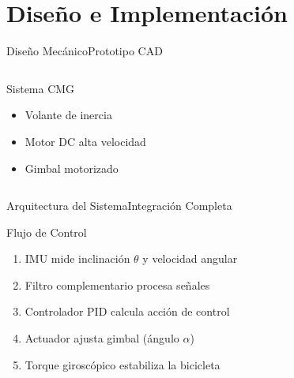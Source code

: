 \documentclass[10pt,xcolor={dvipsnames}]{beamer}
\begin{document}
\section{Diseño e Implementación}
\begin{frame}{Diseño Mecánico}{Prototipo CAD}

\begin{center}
\end{center}

\vspace{0.3cm}

\begin{columns}
\begin{block}{Sistema CMG}
\begin{itemize}
    \item Volante de inercia
    \item Motor DC alta velocidad
    \item Gimbal motorizado
\end{itemize}
\end{block}

\end{columns}
\end{frame}

\begin{frame}{Arquitectura del Sistema}{Integración Completa}

\begin{center}
\end{center}

\vspace{0.3cm}

\begin{block}{Flujo de Control}
\begin{enumerate}
    \item IMU mide inclinación $\theta$ y velocidad angular
    \item Filtro complementario procesa señales
    \item Controlador PID calcula acción de control
    \item Actuador ajusta gimbal (ángulo $\alpha$)
    \item Torque giroscópico estabiliza la bicicleta
\end{enumerate}
\end{block}
\end{frame}
\end{document}
